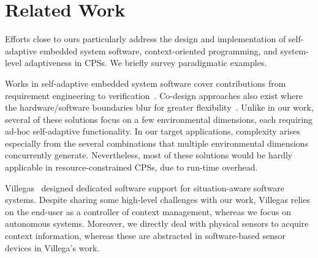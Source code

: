 \section{Related Work}
\label{sec:related}

Efforts close to ours particularly address the design and
implementation of self-adaptive embedded system software,
context-oriented programming, and system-level adaptiveness in
CPSs. We briefly survey paradigmatic examples.

Works in self-adaptive embedded system software
cover contributions from requirement engineering to
verification~\cite{cheng:adaptive}. Co-design approaches also exist
where the hardware/software boundaries blur for greater
flexibility~\cite{diguet11:closed}. Unlike in our work, several of
these solutions focus on a few environmental dimensions, each
requiring ad-hoc self-adaptive functionality. In our target
applications, complexity arises especially from the several
combinations that multiple environmental dimensions concurrently
generate. Nevertheless, most of these solutions would be hardly
applicable in resource-constrained CPSs, due to
run-time overhead.

Villegas~\cite{VilegasPhD13} designed dedicated software support for
situation-aware software systems. Despite sharing some high-level
challenges with our work, Villegas relies on the end-user as a
controller of context management, whereas we focus on autonomous
systems. Moreover, we directly deal with physical sensors to acquire
context information, whereas these are abstracted in software-based
sensor devices in Villega's work.


